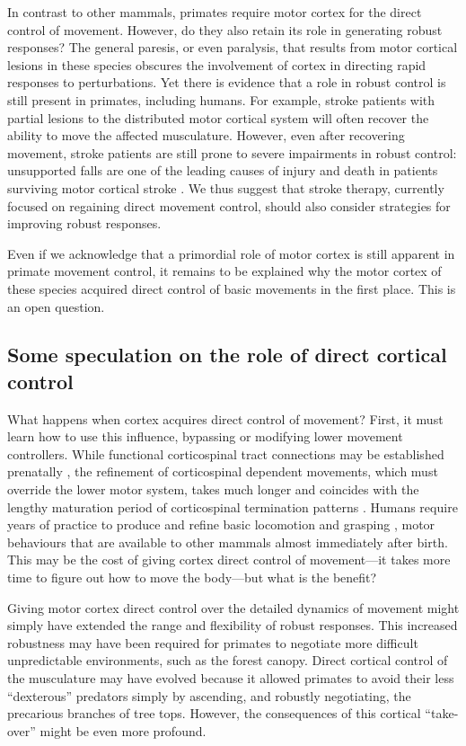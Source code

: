 In contrast to other mammals, primates require motor cortex for the direct control of movement. However, do they also retain its role in generating robust responses? The general paresis, or even paralysis, that results from motor cortical lesions in these species obscures the involvement of cortex in directing rapid responses to perturbations. Yet there is evidence that a role in robust control is still present in primates, including humans. For example, stroke patients with partial lesions to the distributed motor cortical system will often recover the ability to move the affected musculature. However, even after recovering movement, stroke patients are still prone to severe impairments in robust control: unsupported falls are one of the leading causes of injury and death in patients surviving motor cortical stroke \citep{Jacobs2014}. We thus suggest that stroke therapy, currently focused on regaining direct movement control, should also consider strategies for improving robust responses.

Even if we acknowledge that a primordial role of motor cortex is still apparent in primate movement control, it remains to be explained why the motor cortex of these species acquired direct control of basic movements in the first place. This is an open question.

\subsection{Some speculation on the role of direct cortical control}

What happens when cortex acquires direct control of movement? First, it must learn how to use this influence, bypassing or modifying lower movement controllers. While functional corticospinal tract connections may be established prenatally \citep{Eyre2000}, the refinement of corticospinal dependent movements, which must override the lower motor system, takes much longer and coincides with the lengthy maturation period of corticospinal termination patterns \citep{Lawrence1976}. Humans require years of practice to produce and refine basic locomotion and grasping \citep{Thelen1985,VonHofsten1989}, motor behaviours that are available to other mammals almost immediately after birth. This may be the cost of giving cortex direct control of movement---it takes more time to figure out how to move the body---but what is the benefit?

Giving motor cortex direct control over the detailed dynamics of movement might simply have extended the range and flexibility of robust responses. This increased robustness may have been required for primates to negotiate more difficult unpredictable environments, such as the forest canopy. Direct cortical control of the musculature may have evolved because it allowed primates to avoid their less ``dexterous'' predators simply by ascending, and robustly negotiating, the precarious branches of tree tops. However, the consequences of this cortical ``take-over'' might be even more profound.

